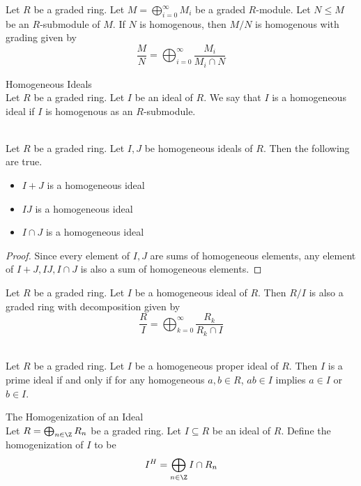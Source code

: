 \documentclass[a4paper]{article}
\begin{document}
\begin{prp}{}{} Let $R$ be a graded ring. Let $M=\bigoplus_{i=0}^\infty M_i$ be a graded $R$-module. Let $N\leq M$ be an $R$-submodule of $M$. If $N$ is homogenous, then $M/N$ is homogenous with grading given by $$\frac{M}{N}=\bigoplus_{i=0}^\infty\frac{M_i}{M_i\cap N}$$
\end{prp}

\begin{defn}{Homogeneous Ideals}{}\\
Let $R$ be a graded ring. Let $I$ be an ideal of $R$. We say that $I$ is a homogeneous ideal if $I$ is homogenous as an $R$-submodule. 
\end{defn}

\begin{lmm}{}{}\\
Let $R$ be a graded ring. Let $I,J$ be homogeneous ideals of $R$. Then the following are true. 
\begin{itemize}
\item $I+J$ is a homogeneous ideal
\item $IJ$ is a homogeneous ideal
\item $I\cap J$ is a homogeneous ideal
\end{itemize}
\begin{proof}
Since every element of $I,J$ are sums of homogeneous elements, any element of $I+J,IJ,I\cap J$ is also a sum of homogeneous elements.
\end{proof}
\end{lmm}

\begin{prp}{}{} Let $R$ be a graded ring. Let $I$ be a homogeneous ideal of $R$. Then $R/I$ is also a graded ring with decomposition given by $$\frac{R}{I}=\bigoplus_{k=0}^\infty\frac{R_k}{R_k\cap I}$$
\end{prp}

\begin{lmm}{}{}\\
Let $R$ be a graded ring. Let $I$ be a homogeneous proper ideal of $R$. Then $I$ is a prime ideal if and only if for any homogeneous $a,b\in R$, $ab\in I$ implies $a\in I$ or $b\in I$. 
\end{lmm}

\begin{defn}{The Homogenization of an Ideal}{}\\
Let $R=\bigoplus_{n\in\Z}R_n$ be a graded ring. Let $I\subseteq R$ be an ideal of $R$. Define the homogenization of $I$ to be $$I^H=\bigoplus_{n\in\Z}I\cap R_n$$
\end{defn}
\end{document}

